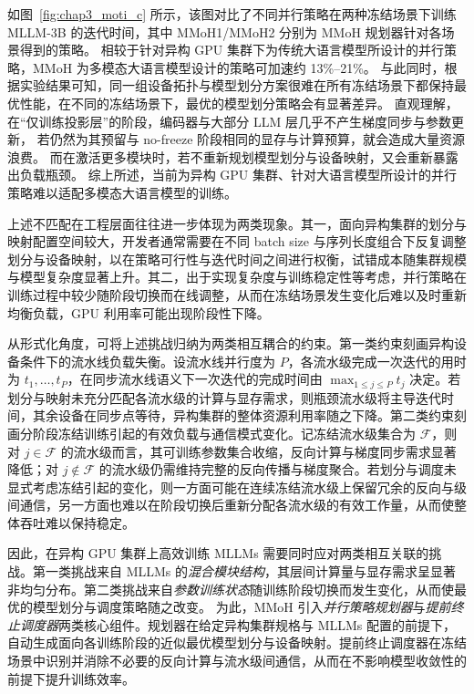 如图~\ref{fig:chap3_moti_c} 所示，该图对比了不同并行策略在两种冻结场景下训练 MLLM-3B 的迭代时间，其中 MMoH1/MMoH2 分别为 MMoH 规划器针对各场景得到的策略。
相较于针对异构 GPU 集群下为传统大语言模型所设计的并行策略，MMoH 为多模态大语言模型设计的策略可加速约 13\%--21\%。
与此同时，根据实验结果可知，同一组设备拓扑与模型划分方案很难在所有冻结场景下都保持最优性能，在不同的冻结场景下，最优的模型划分策略会有显著差异。
直观理解，在“仅训练投影层”的阶段，编码器与大部分 LLM 层几乎不产生梯度同步与参数更新，
若仍然为其预留与 no-freeze 阶段相同的显存与计算预算，就会造成大量资源浪费。
而在激活更多模块时，若不重新规划模型划分与设备映射，又会重新暴露出负载瓶颈。
综上所述，当前为异构 GPU 集群、针对大语言模型所设计的并行策略难以适配多模态大语言模型的训练。

上述不匹配在工程层面往往进一步体现为两类现象。其一，面向异构集群的划分与映射配置空间较大，开发者通常需要在不同 batch size 与序列长度组合下反复调整划分与设备映射，以在策略可行性与迭代时间之间进行权衡，试错成本随集群规模与模型复杂度显著上升。其二，出于实现复杂度与训练稳定性等考虑，并行策略在训练过程中较少随阶段切换而在线调整，从而在冻结场景发生变化后难以及时重新均衡负载，GPU 利用率可能出现阶段性下降。

从形式化角度，可将上述挑战归纳为两类相互耦合的约束。第一类约束刻画异构设备条件下的流水线负载失衡。设流水线并行度为 $P$，各流水级完成一次迭代的用时为 $t_1,\ldots,t_P$，在同步流水线语义下一次迭代的完成时间由 $\max_{1\le j\le P} t_j$ 决定。若划分与映射未充分匹配各流水级的计算与显存需求，则瓶颈流水级将主导迭代时间，其余设备在同步点等待，异构集群的整体资源利用率随之下降。第二类约束刻画分阶段冻结训练引起的有效负载与通信模式变化。记冻结流水级集合为 $\mathcal{F}$，则对 $j\in\mathcal{F}$ 的流水级而言，其可训练参数集合收缩，反向计算与梯度同步需求显著降低；对 $j\notin\mathcal{F}$ 的流水级仍需维持完整的反向传播与梯度聚合。若划分与调度未显式考虑冻结引起的变化，则一方面可能在连续冻结流水级上保留冗余的反向与级间通信，另一方面也难以在阶段切换后重新分配各流水级的有效工作量，从而使整体吞吐难以保持稳定。

因此，在异构 GPU 集群上高效训练 MLLMs 需要同时应对两类相互关联的挑战。第一类挑战来自 MLLMs 的\emph{混合模块结构}，其层间计算量与显存需求呈显著非均匀分布。第二类挑战来自\emph{参数训练状态}随训练阶段切换而发生变化，从而使最优的模型划分与调度策略随之改变。
为此，MMoH 引入\emph{并行策略规划器}与\emph{提前终止调度器}两类核心组件。规划器在给定异构集群规格与 MLLMs 配置的前提下，自动生成面向各训练阶段的近似最优模型划分与设备映射。提前终止调度器在冻结场景中识别并消除不必要的反向计算与流水级间通信，从而在不影响模型收敛性的前提下提升训练效率。


